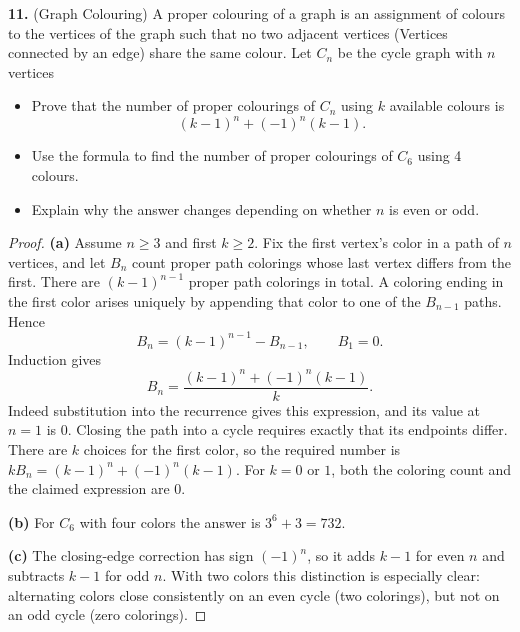 \documentclass[12pt]{amsart}
\begin{document}
\begin{onehalfspace}
        \noindent\textbf{11.} (Graph Colouring) A proper colouring of a graph is an assignment of
        colours to the vertices of the graph such that no two adjacent vertices (Vertices connected by
        an edge) share the same colour.
        Let $C_n$ be the cycle graph with $n$ vertices
        \begin{itemize}
            \item[(a)] Prove that the number of proper colourings of $C_n$ using $k$ available colours is
            \[
                (k-1)^n + (-1)^n(k-1).
            \]
            \item[(b)] Use the formula to find the number of proper colourings of $C_6$ using 4 colours.
            \item[(c)] Explain why the answer changes depending on whether $n$ is even or odd.
        \end{itemize}

        \begin{proof}
            \textbf{(a)} Assume $n\ge3$ and first $k\ge2$. Fix the first
            vertex's color in a path of $n$ vertices, and let $B_n$ count
            proper path colorings whose last vertex differs from the first.
            There are $(k-1)^{n-1}$ proper path colorings in total.
            A coloring ending in the first color arises uniquely by
            appending that color to one of the $B_{n-1}$ paths. Hence
            \[
                B_n=(k-1)^{n-1}-B_{n-1},\qquad B_1=0.
            \]
            Induction gives
            \[
                B_n=\frac{(k-1)^n+(-1)^n(k-1)}{k}.
            \]
            Indeed substitution into the recurrence gives this expression,
            and its value at $n=1$ is $0$. Closing the path into a cycle
            requires exactly that its endpoints differ. There are $k$
            choices for the first color, so the required number is
            $kB_n=(k-1)^n+(-1)^n(k-1)$. For $k=0$ or $1$, both the
            coloring count and the claimed expression are $0$.

            \textbf{(b)} For $C_6$ with four colors the answer is
            $3^6+3=732$.

            \textbf{(c)} The closing-edge correction has sign $(-1)^n$,
            so it adds $k-1$ for even $n$ and subtracts $k-1$ for odd $n$.
            With two colors this distinction is especially clear:
            alternating colors close consistently on an even cycle
            (two colorings), but not on an odd cycle (zero colorings).
        \end{proof}


\end{onehalfspace}
\end{document}
